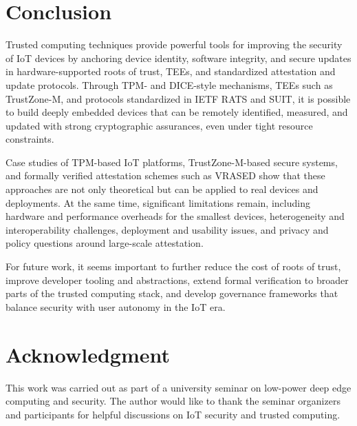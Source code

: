 \documentclass[conference,11pt,a4paper]{IEEEtran}
\begin{document}
\section{Conclusion}
Trusted computing techniques provide powerful tools for improving the security of IoT devices by anchoring device identity, software integrity, and secure updates in hardware-supported roots of trust, TEEs, and standardized attestation and update protocols.\cite{tcg_iot,rats_arch,suit_survey} Through TPM- and DICE-style mechanisms, TEEs such as TrustZone-M, and protocols standardized in IETF RATS and SUIT, it is possible to build deeply embedded devices that can be remotely identified, measured, and updated with strong cryptographic assurances, even under tight resource constraints.\cite{suit_arch,root_of_trust_lowend}

Case studies of TPM-based IoT platforms, TrustZone-M-based secure systems, and formally verified attestation schemes such as VRASED show that these approaches are not only theoretical but can be applied to real devices and deployments.\cite{tzm_framework,vRased_usenix,tcg_tpm_iot} At the same time, significant limitations remain, including hardware and performance overheads for the smallest devices, heterogeneity and interoperability challenges, deployment and usability issues, and privacy and policy questions around large-scale attestation.

For future work, it seems important to further reduce the cost of roots of trust, improve developer tooling and abstractions, extend formal verification to broader parts of the trusted computing stack, and develop governance frameworks that balance security with user autonomy in the IoT era.\cite{resource_constrained,ra_survey,tcg_iot}

\section*{Acknowledgment}
This work was carried out as part of a university seminar on low-power deep edge computing and security. The author would like to thank the seminar organizers and participants for helpful discussions on IoT security and trusted computing.
\end{document}
